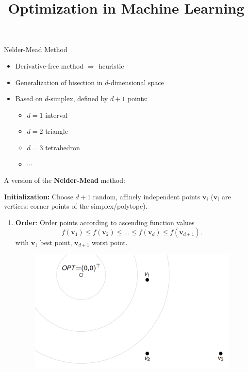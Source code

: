 \documentclass[11pt,compress,t,notes=noshow, xcolor=table]{beamer}
\title{Optimization in Machine Learning}
\date{}
\begin{document}
\sloppy

\begin{vbframe}{Nelder-Mead Method}

\begin{itemize}
    \item Derivative-free method $\Rightarrow$ heuristic
    \item Generalization of bisection in $d$-dimensional space
    \item Based on $d$-simplex, defined by $d + 1$ points:
        \begin{itemize}
            \small
            \item $d = 1$ interval
            \item $d = 2$ triangle
            \item $d = 3$ tetrahedron
            \item $\cdots$
        \end{itemize}
\end{itemize}

\framebreak

A version of the \textbf{Nelder-Mead} method:

\medskip

\textbf{Initialization:} Choose $d + 1$ random, affinely independent points $\mathbf{v}_i$ ($\mathbf{v}_i$ are vertices: corner points of the simplex/polytope).

\medskip

\begin{enumerate}
\item \textbf{Order}: Order points according to ascending function values
$$
f(\mathbf{v}_1) \leq f(\mathbf{v}_2) \leq \ldots \leq f(\mathbf{v}_d) \leq f(\mathbf{v}_{d + 1}).
$$
with $\mathbf{v}_1$ best point, $\mathbf{v}_{d + 1}$ worst point.

\begin{figure}
\includegraphics[width = 0.5\linewidth]{figure_man/Nelder01.png}
\end{figure}


\end{enumerate}
\end{vbframe}
\end{document}

